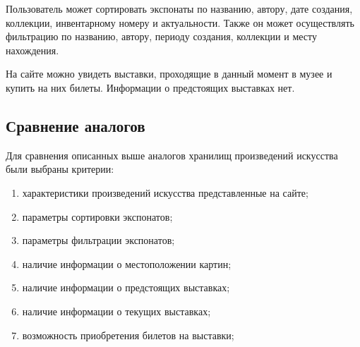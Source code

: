 Пользователь может сортировать экспонаты по названию, автору, дате создания, коллекции, инвентарному номеру и актуальности. Также он может осуществлять фильтрацию по названию, автору, периоду создания, коллекции и месту нахождения.

На сайте можно увидеть выставки, проходящие в данный момент в музее и купить на них билеты. Информации о предстоящих выставках нет.

\FloatBarrier
{}
\FloatBarrier

\subsection{Сравнение аналогов}
Для сравнения описанных выше аналогов хранилищ произведений искусства были выбраны критерии:
\begin{enumerate}[label={\arabic*)}]
	\item характеристики произведений искусства представленные на сайте;
	\item параметры сортировки экспонатов;	
	\item параметры фильтрации экспонатов;	
	\item наличие информации о местоположении картин;	
	\item наличие информации о предстоящих выставках;	
	\item наличие информации о текущих выставках;
	\item возможность приобретения билетов на выставки;
\end{enumerate}

